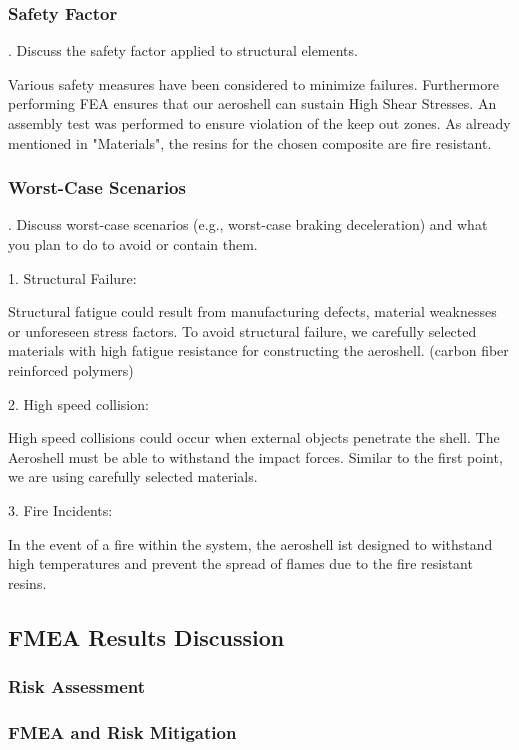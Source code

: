 \subsubsection{Safety Factor}
.  Discuss the safety factor applied to structural elements.
\par %
Various safety measures have been considered to minimize failures. Furthermore performing FEA ensures that our aeroshell can sustain High Shear Stresses. An assembly test was performed to ensure violation of the keep out zones. As already mentioned in "Materials", the resins for the chosen composite are fire resistant.
\par %
\subsubsection{Worst-Case Scenarios}
.  Discuss worst-case scenarios (e.g., worst-case braking deceleration) and what you plan to do to avoid or contain them.
\par %
1. Structural Failure: 
\par %
Structural fatigue could result from manufacturing defects, material weaknesses or unforeseen stress factors. To avoid structural failure, we carefully selected materials with high fatigue resistance for constructing the aeroshell. (carbon fiber reinforced polymers)
\par %
2. High speed collision:
\par %
High speed collisions could occur when external objects penetrate the shell. The Aeroshell must be able to withstand the impact forces. Similar to the first point, we are using carefully selected materials.
\par %
3. Fire Incidents:
\par %
In the event of a fire within the system, the aeroshell ist designed to withstand high temperatures and prevent the spread of flames due to the fire resistant resins.
\par %
\subsection{FMEA Results Discussion}
\subsubsection{Risk Assessment}

\subsubsection{FMEA and Risk Mitigation}

